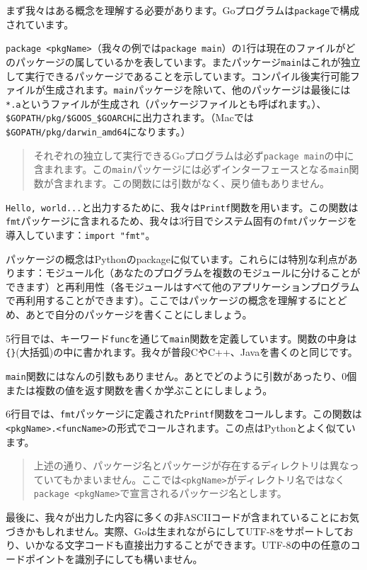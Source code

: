 まず我々はある概念を理解する必要があります。Goプログラムは\texttt{package}で構成されています。

\texttt{package <pkgName>}（我々の例では\texttt{package main}）の1行は現在のファイルがどのパッケージの属しているかを表しています。またパッケージ\texttt{main}はこれが独立して実行できるパッケージであることを示しています。コンパイル後実行可能ファイルが生成されます。\texttt{main}パッケージを除いて、他のパッケージは最後には\texttt{*.a}というファイルが生成され（パッケージファイルとも呼ばれます。）、\texttt{\$GOPATH\//pkg\//\$GOOS\_\$GOARCH}に出力されます。（Macでは\texttt{\$GOPATH\//pkg\//darwin\_amd64}になります。）

\begin{quote}
  それぞれの独立して実行できるGoプログラムは必ず\texttt{package main}の中に含まれます。この\texttt{main}パッケージには必ずインターフェースとなる\texttt{main}関数が含まれます。この関数には引数がなく、戻り値もありません。
\end{quote}

\texttt{Hello, world...}と出力するために、我々は\texttt{Printf}関数を用います。この関数は\texttt{fmt}パッケージに含まれるため、我々は3行目でシステム固有の\texttt{fmt}パッケージを導入しています：\texttt{import "fmt"}。

パッケージの概念はPythonのpackageに似ています。これらには特別な利点があります：モジュール化（あなたのプログラムを複数のモジュールに分けることができます）と再利用性（各モジュールはすべて他のアプリケーションプログラムで再利用することができます）。ここではパッケージの概念を理解するにとどめ、あとで自分のパッケージを書くことにしましょう。

5行目では、キーワード\texttt{func}を通じて\texttt{main}関数を定義しています。関数の中身は\texttt{\{\}}(大括弧)の中に書かれます。我々が普段CやC++、Javaを書くのと同じです。

\texttt{main}関数にはなんの引数もありません。あとでどのように引数があったり、0個または複数の値を返す関数を書くか学ぶことにしましょう。

6行目では、\texttt{fmt}パッケージに定義された\texttt{Printf}関数をコールします。この関数は\texttt{<pkgName>.<funcName>}の形式でコールされます。この点はPythonとよく似ています。

\begin{quote}
  上述の通り、パッケージ名とパッケージが存在するディレクトリは異なっていてもかまいません。ここでは\texttt{<pkgName>}がディレクトリ名ではなく\texttt{package <pkgName>}で宣言されるパッケージ名とします。
\end{quote}

最後に、我々が出力した内容に多くの非ASCIIコードが含まれていることにお気づきかもしれません。実際、Goは生まれながらにしてUTF-8をサポートしており、いかなる文字コードも直接出力することができます。UTF-8の中の任意のコードポイントを識別子にしても構いません。

